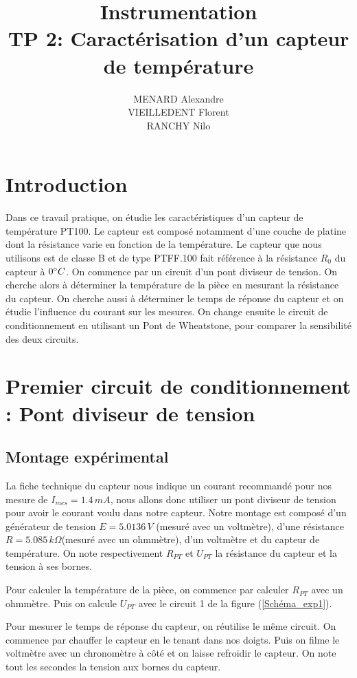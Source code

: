 \documentclass[12pt]{article}
\title{\textbf{Instrumentation} \\ TP 2: Caractérisation d'un capteur de température}
\author{MENARD Alexandre \\ VIEILLEDENT Florent \\ RANCHY Nilo}
\begin{document}
\maketitle

\section*{Introduction}
Dans ce travail pratique, on étudie les caractéristiques d'un capteur de température PT100. Le capteur est composé notamment d'une couche de platine dont la résistance varie en fonction de la température. Le capteur que nous utilisons est de classe B et de type PTFF.100 fait référence à la résistance $R_0$ du capteur à $0\degree C$. On commence par un circuit d'un pont diviseur de tension. On cherche alors à déterminer la température de la pièce en mesurant la résistance du capteur. On cherche aussi à déterminer le temps de réponse du capteur et on étudie l'influence du courant sur les mesures. On change ensuite le circuit de conditionnement en utilisant un Pont de Wheatstone, pour comparer la sensibilité des deux circuits.

\section{Premier circuit de conditionnement : Pont diviseur de tension}
\subsection{Montage expérimental}
La fiche technique du capteur nous indique un courant recommandé pour nos mesure de $I_{mes}=1.4\, mA$, nous allons donc utiliser un pont diviseur de tension pour avoir le courant voulu dans notre capteur. Notre montage est composé d'un générateur de tension $E=5.0136\, V$ (mesuré avec un voltmètre), d'une résistance $R=5.085 \, k\Omega$(mesuré avec un ohmmètre), d'un voltmètre et du capteur de température. On note respectivement $R_{PT}$ et $U_{PT}$ la résistance du capteur et la tension à ses bornes. 

Pour calculer la température de la pièce, on commence par calculer $R_{PT}$ avec un ohmmètre. Puis on calcule $U_{PT}$ avec le circuit 1 de la figure (\ref{Schéma_exp1}).

Pour mesurer le temps de réponse du capteur, on réutilise le même circuit. On commence par chauffer le capteur en le tenant dans nos doigts. Puis on filme le voltmètre avec un chronomètre à côté et on laisse refroidir le capteur. On note tout les secondes la tension aux bornes du capteur.  
\end{document}
